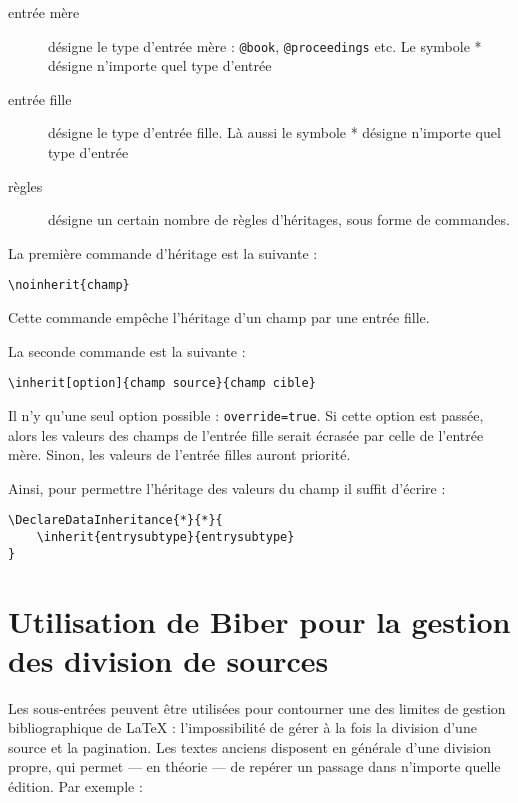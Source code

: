\begin{description}
\item[entrée mère]désigne le type d'entrée mère : \verb|@book|, \verb|@proceedings| etc. Le symbole * désigne n'importe quel type d'entrée
\item[entrée fille]désigne le type d'entrée fille. Là aussi le symbole * désigne n'importe quel type d'entrée
\item[règles] désigne un certain nombre de règles d'héritages, sous forme de commandes.
\end{description}

La première commande d'héritage est la suivante :

\begin{verbatim}
\noinherit{champ}
\end{verbatim}

Cette commande empêche l'héritage d'un champ par une entrée fille.

La seconde commande est la suivante :

\begin{verbatim}
\inherit[option]{champ source}{champ cible}
\end{verbatim}

Il n'y qu'une seul option possible : \verb|override=true|. Si cette option est passée, alors les valeurs des champs de l'entrée fille serait écrasée par celle de l'entrée mère. Sinon, les valeurs de l'entrée filles auront priorité.

Ainsi, pour permettre l'héritage des valeurs du champ  il suffit d'écrire :

\begin{verbatim}
\DeclareDataInheritance{*}{*}{
	\inherit{entrysubtype}{entrysubtype}
}
\end{verbatim}

\section[Division des sources antiques]{Utilisation de Biber pour la gestion des division de sources}\label{divisionsource}

Les sous-entrées peuvent être utilisées pour contourner une des limites de gestion bibliographique de \LaTeX{} : l'impossibilité de gérer à la fois  la division d'une source et la pagination. Les textes anciens disposent en générale d'une division propre, qui permet --- en théorie ---  de repérer un passage dans n'importe quelle édition. Par exemple : 

